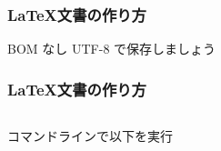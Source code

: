 \begin{frame}[fragile]
	\frametitle{\LaTeX 文書の作り方}
	
	
	BOM なし UTF-8 で保存しましょう
\end{frame}

\begin{frame}
	\frametitle{\LaTeX 文書の作り方}
	\begin{columns}[c]
		\begin{column}{0.5\textwidth}
			コマンドラインで以下を実行
	
	
		\end{column}
		\begin{column}{0.4\textwidth}
		\end{column}
	\end{columns}
\end{frame}

